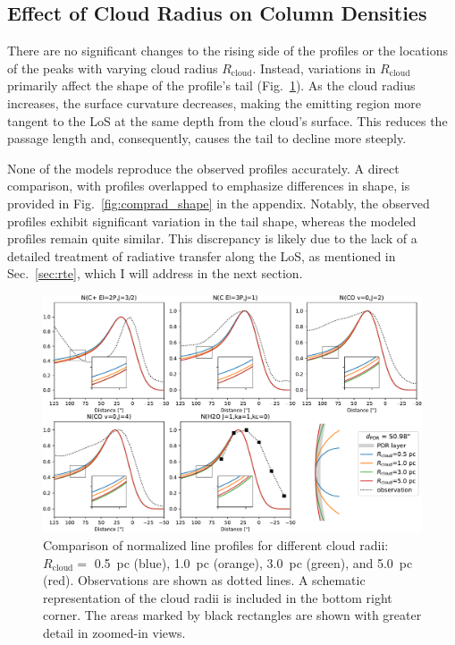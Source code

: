 \documentclass[12pt,a4paper]{article}
\newcommand{\mr}{\mathrm}
\begin{document}
\subsection{Effect of Cloud Radius on Column Densities} \label{sec:comprad}

There are no significant changes to the rising side of the profiles or the locations of the peaks with varying cloud radius $R_\mr{cloud}$. Instead, variations in $R_\mr{cloud}$ primarily affect the shape of the profile's tail (Fig.~\ref{fig:comprad}). As the cloud radius increases, the surface curvature decreases, making the emitting region more tangent to the LoS at the same depth from the cloud's surface. This reduces the passage length and, consequently, causes the tail to decline more steeply.

None of the models reproduce the observed profiles accurately. A direct comparison, with profiles overlapped to emphasize differences in shape, is provided in Fig.~\ref{fig:comprad_shape} in the appendix. Notably, the observed profiles exhibit significant variation in the tail shape, whereas the modeled profiles remain quite similar. This discrepancy is likely due to the lack of a detailed treatment of radiative transfer along the LoS, as mentioned in Sec.~\ref{sec:rte}, which I will address in the next section.

\begin{figure}[h]
    \centering
    \includegraphics[width=\textwidth,keepaspectratio]{comp_cloud_radius.pdf}
    \caption{Comparison of normalized line profiles for different cloud radii: $R_\mr{cloud} = $ \qty{0.5}{pc} (blue), \qty{1.0}{pc} (orange), \qty{3.0}{pc} (green), and \qty{5.0}{pc} (red). Observations are shown as dotted lines. A schematic representation of the cloud radii is included in the bottom right corner. The areas marked by black rectangles are shown with greater detail in zoomed-in views.} \label{fig:comprad}
\end{figure}
\end{document}
